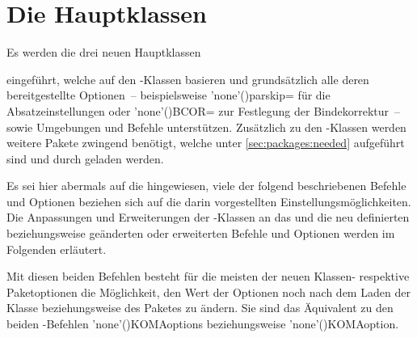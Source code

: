 \chapter[%
  Die Hauptklassen \Class*{tudscrbook}, \Class*{tudscrreprt} und 
  \Class*{tudscrartcl}%
]{%
  Die Hauptklassen%
  \label{sec:mainclasses}%
}

\begin{DeclareEntity*}{}
\begin{DeclareEntity*}{}
\begin{DeclareEntity*}{}
%
Es werden die drei neuen Hauptklassen
%
\begin{description}
\item {}
\item {}
\item {}
\end{description}
%
eingeführt, welche auf den \KOMAScript-Klassen basieren und grundsätzlich alle 
deren bereitgestellte Optionen~-- beispielsweise 
\Option'none'(){parskip=} für die 
Absatzeinstellungen oder 
\Option'none'(){BCOR=} zur Festlegung der 
Bindekorrektur~-- sowie Umgebungen und Befehle unterstützen. Zusätzlich zu den 
\KOMAScript-Klassen werden weitere Pakete zwingend benötigt, welche unter 
\autoref{sec:packages:needed} aufgeführt sind und durch \TUDScript geladen 
werden.

Es sei hier abermals auf die  
hingewiesen, viele der folgend beschriebenen Befehle und Optionen beziehen sich 
auf die darin vorgestellten Einstellungsmöglichkeiten. Die Anpassungen und 
Erweiterungen der \KOMAScript-Klassen an das \CD und die neu definierten 
beziehungsweise geänderten oder erweiterten Befehle und Optionen werden im 
Folgenden erläutert.

\begin{Declaration}
  {}
\begin{Declaration}
  {}
\printdeclarationlist[Optionen|!]

Mit diesen beiden Befehlen besteht für die meisten der neuen Klassen- respektive
Paketoptionen die Möglichkeit, den Wert der Optionen noch nach dem Laden der 
Klasse beziehungsweise des Paketes zu ändern. Sie sind das Äquivalent zu den 
beiden \KOMAScript-Befehlen \Macro'none'(){KOMAoptions} 
beziehungsweise \Macro'none'(){KOMAoption}.


\end{Declaration}
\end{Declaration}
\end{DeclareEntity*}
\end{DeclareEntity*}
\end{DeclareEntity*}
